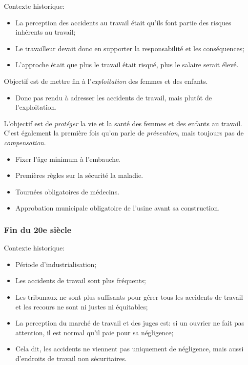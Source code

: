 \documentclass[10pt, french]{article}
\begin{document}
\begin{multicols*}{3}
Contexte historique:
\begin{itemize}[leftmargin = *]
	\item	La perception des accidents au travail était qu'ils font partie des risques inhérents au travail;
	\item	Le travailleur devait donc en supporter la responsabilité et les conséquences;
	\item	L'approche était que plus le travail était risqué, plus le salaire serait élevé.
\end{itemize}

\begin{rappel_enhanced}
Objectif est de mettre fin à l'\textit{exploitation} des femmes et des enfants.

\begin{itemize}[leftmargin = *]
\item	Donc pas rendu à adresser les accidents de travail, mais plutôt de l'exploitation.
\end{itemize}
\end{rappel_enhanced}

\begin{rappel_enhanced}
L’objectif est de \textit{protéger} la vie et la santé des femmes et des enfants au travail. C'est également la première fois qu'on parle de \textit{prévention}, mais toujours pas de \textit{compensation}.
\begin{itemize}[leftmargin = *]
	\item	Fixer l'âge minimum à l'embauche.
	\item	Premières règles sur la sécurité la maladie.
	\item	Tournées obligatoires de médecins.
	\item	Approbation municipale obligatoire de l'usine avant sa construction.
\end{itemize}
\end{rappel_enhanced}

\subsubsection*{Fin du 20e siècle}

Contexte historique:
\begin{itemize}[leftmargin = *]
	\item	Période d'industrialisation;
	\item	Les accidents de travail sont plus fréquents;
	\item	Les tribunaux ne sont plus suffisants pour gérer tous les accidents de travail et les recours ne sont ni justes ni équitables;
	\item	La perception du marché de travail et des juges est: si un ouvrier ne fait pas attention, il est normal qu'il paie pour sa négligence;
	\item	Cela dit, les accidents ne viennent pas uniquement de négligence, mais aussi d'endroits de travail non sécuritaires.
\end{itemize}


\end{multicols*}
\end{document}
